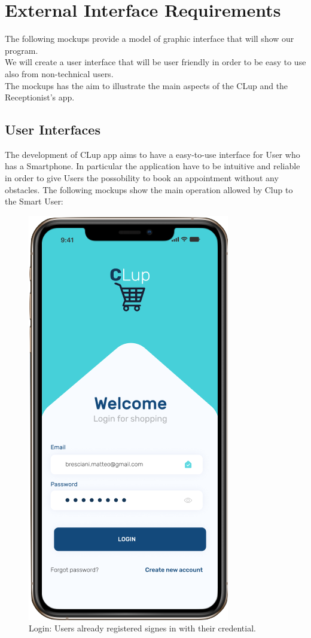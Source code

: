 \section{External Interface Requirements}
The following mockups provide a model of graphic interface that will show our program. \\
We will create a user interface that will be user friendly in order to be easy to use also from non-technical users. \\
The mockups has the aim to illustrate the main aspects of the CLup and the Receptionist's app.
\subsection{User Interfaces}
The development of CLup app aims to have a easy-to-use interface for User who has a Smartphone. In particular the application have to be intuitive and reliable in order to give Users the possobility to book an appointment without any obstacles.
The following mockups show the main operation allowed by Clup to the Smart User:



\begin{figure}[h]
  \caption{Login: Users already registered signes in with their credential.}
  \label{fig: Login}
  \centering
  \includegraphics[scale=0.35]{images/mockup/login.png}
\end{figure}

